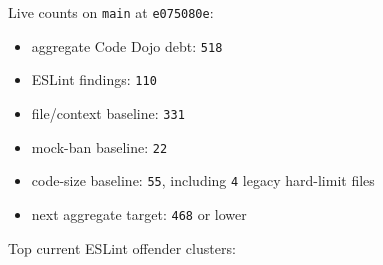 Live counts on \texttt{m\allowbreak{}a\allowbreak{}i\allowbreak{}n} at \texttt{e\allowbreak{}0\allowbreak{}7\allowbreak{}5\allowbreak{}0\allowbreak{}8\allowbreak{}0\allowbreak{}e}:

\begin{itemize}
\tightlist
\item
  aggregate Code Dojo debt: \texttt{5\allowbreak{}1\allowbreak{}8}
\item
  ESLint findings: \texttt{1\allowbreak{}1\allowbreak{}0}
\item
  file/context baseline: \texttt{3\allowbreak{}3\allowbreak{}1}
\item
  mock-ban baseline: \texttt{2\allowbreak{}2}
\item
  code-size baseline: \texttt{5\allowbreak{}5}, including \texttt{4} legacy hard-limit files
\item
  next aggregate target: \texttt{4\allowbreak{}6\allowbreak{}8} or lower
\end{itemize}

Top current ESLint offender clusters:

